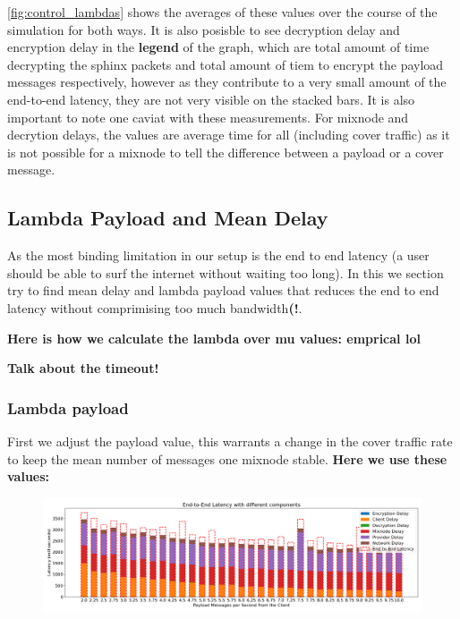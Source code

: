 \documentclass[a4paper,11pt,oneside]{report}
\begin{document}
\autoref{fig:control_lambdas} shows the averages of these values over the course of the simulation for both ways. It is also posisble to see decryption delay and encryption delay in the \textbf{legend} of the graph, which are total amount of time decrypting the sphinx packets and total amount of tiem to encrypt the payload messages respectively, however as they contribute to a very small amount of the end-to-end latency, they are not very visible on the stacked bars. 
It is also important to note one caviat with these measurements. For mixnode and decrytion delays, the values are average time for all (including cover traffic) as it is not possible for a mixnode to tell the difference between a payload or a cover message.

\subsection{Lambda Payload and Mean Delay}
As the most binding limitation in our setup is the end to end latency (a user should be able to surf the internet without waiting too long). In this we section try to find mean delay and lambda payload values that reduces the end to end latency without comprimising too much bandwidth\textbf{(!}.

\textbf{Here is how we calculate the lambda over mu values: emprical lol}

\textbf{Talk about the timeout!}

\subsubsection{Lambda payload}

First we adjust the payload value, this warrants a change in the cover traffic rate to keep the mean number of messages one mixnode stable. \textbf{Here we use these values: }

\begin{figure}[htbp]
    \centering
    \includegraphics[width=\textwidth]{plots/lambdas_latency_components.png}
    \caption{}
    \label{fig:lambdas_latency}
\end{figure}
\end{document}
